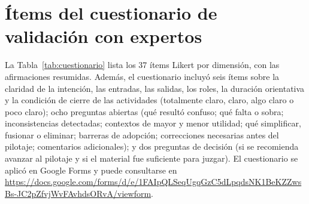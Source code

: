 \documentclass[12pt,letterpaper,oneside]{report}
\begin{document}
\chapter{Ítems del cuestionario de validación con expertos}
\label{anx:cuestionario}
La Tabla~\ref{tab:cuestionario} lista los 37 ítems Likert por dimensión, con las
afirmaciones resumidas. Además, el cuestionario incluyó seis ítems sobre la
claridad de la intención, las entradas, las salidas, los roles, la duración
orientativa y la condición de cierre de las actividades (totalmente claro, claro,
algo claro o poco claro); ocho preguntas abiertas (qué resultó confuso; qué falta
o sobra; inconsistencias detectadas; contextos de mayor y menor utilidad; qué
simplificar, fusionar o eliminar; barreras de adopción; correcciones necesarias
antes del pilotaje; comentarios adicionales); y dos preguntas de decisión (si se
recomienda avanzar al pilotaje y si el material fue suficiente para juzgar).
El cuestionario se aplicó en Google Forms y puede consultarse en
\url{https://docs.google.com/forms/d/e/1FAIpQLSeqUgqGzC5dLpqdsNK1BeKZZwsBs-JC2pZfvjWvFAvhdsORvA/viewform}.
\end{document}
